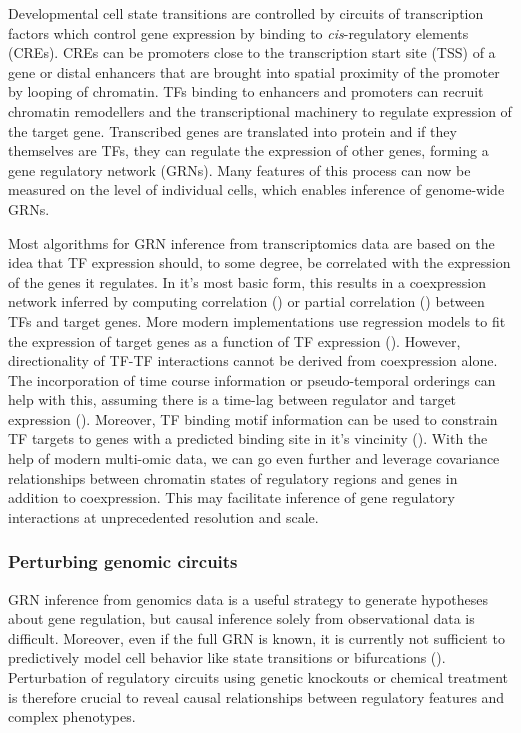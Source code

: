 Developmental cell state transitions are controlled by circuits of transcription factors which control gene expression by binding to \textit{cis}-regulatory elements (CREs). CREs can be promoters close to the transcription start site (TSS) of a gene or distal enhancers that are brought into spatial proximity of the promoter by looping of chromatin. TFs binding to enhancers and promoters can recruit chromatin remodellers and the transcriptional machinery to regulate expression of the target gene. Transcribed genes are translated into protein and if they themselves are TFs, they can regulate the expression of other genes, forming a gene regulatory network (GRNs). Many features of this process can now be measured on the level of individual cells, which enables inference of genome-wide GRNs.

Most algorithms for GRN inference from transcriptomics data are based on the idea that TF expression should, to some degree, be correlated with the expression of the genes it regulates. In it's most basic form, this results in a coexpression network inferred by computing correlation (\cite{stuart_gene-coexpression_2003}) or partial correlation (\cite{kim_ppcor_2015}) between TFs and target genes. More modern implementations use regression models to fit the expression of target genes as a function of TF expression (\cite{aibar_scenic_2017}). However, directionality of TF-TF interactions cannot be derived from coexpression alone. The incorporation of time course information or pseudo-temporal orderings can help with this, assuming there is a time-lag between regulator and target expression (\cite{qiu_inferring_2020}). Moreover, TF binding motif information can be used to constrain TF targets to genes with a predicted binding site in it's vincinity (\cite{aibar_scenic_2017}). With the help of modern multi-omic data, we can go even further and leverage covariance relationships between chromatin states of regulatory regions and genes in addition to coexpression. This may facilitate inference of gene regulatory interactions at unprecedented resolution and scale.


\subsubsection{Perturbing genomic circuits}

GRN inference from genomics data is a useful strategy to generate hypotheses about gene regulation, but causal inference solely from observational data is difficult. Moreover, even if the full GRN is known, it is currently not sufficient to predictively model cell behavior like state transitions or bifurcations (\cite{teschendorff_statistical_2021}). Perturbation of regulatory circuits using genetic knockouts or chemical treatment is therefore crucial to reveal causal relationships between regulatory features and complex phenotypes.

